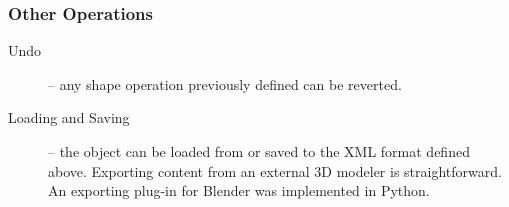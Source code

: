 \subsubsection{Other Operations}

\begin{description}
	\item[Undo] --
		any shape operation previously defined can be reverted.
		
	\item[Loading and Saving] --
		the object can be loaded from or saved to the XML format defined above.
		Exporting content from an external 3D modeler is straightforward.
		An exporting plug-in for Blender was implemented in Python.
\end{description}

